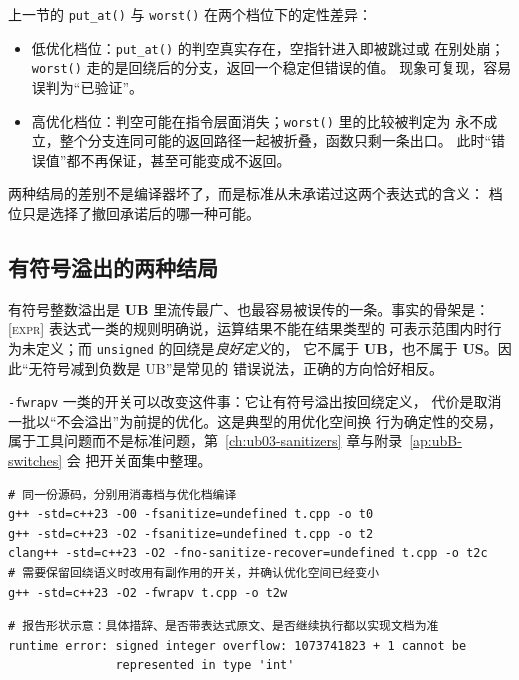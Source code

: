 \documentclass[12pt,a4paper,fontset=fandol]{ctexbook}
\newcommand{\Fn}[1]{\texttt{#1()}}
\newcommand{\Tp}[1]{\texttt{#1}}
\newcommand{\UB}{\textbf{\textsf{UB}}}
\newcommand{\USB}{\textbf{\textsf{US}}}
\newcommand{\Std}[1]{\textsc{[#1]}}
\newcommand{\Clause}[1]{\textsc{\small #1}}
\begin{document}
\begin{casebox}[title={同一份代码的两种命运：空指针与有符号溢出}]
上一节的 \Fn{put\_at} 与 \Fn{worst} 在两个档位下的定性差异：

\begin{itemize}
  \item 低优化档位：\Fn{put\_at} 的判空真实存在，空指针进入即被跳过或
        在别处崩；\Fn{worst} 走的是回绕后的分支，返回一个稳定但错误的值。
        现象可复现，容易误判为“已验证”。
  \item 高优化档位：判空可能在指令层面消失；\Fn{worst} 里的比较被判定为
        永不成立，整个分支连同可能的返回路径一起被折叠，函数只剩一条出口。
        此时“错误值”都不再保证，甚至可能变成不返回。
\end{itemize}

两种结局的差别不是编译器坏了，而是标准从未承诺过这两个表达式的含义：
档位只是选择了撤回承诺后的哪一种可能。
\end{casebox}

\subsection{有符号溢出的两种结局}\label{sec:ub01-overflow}

有符号整数溢出是 \UB{} 里流传最广、也最容易被误传的一条。事实的骨架是：
\Std{expr} \Clause{表达式}一类的规则明确说，运算结果不能在结果类型的
可表示范围内时行为未定义；而 \Tp{unsigned} 的回绕是\emph{良好定义}的，
它不属于 \UB{}，也不属于 \USB{}。因此“无符号减到负数是 UB”是常见的
错误说法，正确的方向恰好相反。

\Tp{-fwrapv} 一类的开关可以改变这件事：它让有符号溢出按回绕定义，
代价是取消一批以“不会溢出”为前提的优化。这是典型的用优化空间换
行为确定性的交易，属于工具问题而不是标准问题，第~\ref{ch:ub03-sanitizers} 章与附录~\ref{ap:ubB-switches} 会
把开关面集中整理。

\begin{lstlisting}[style=shellstyle, caption={命令行样例：在两个档位上观察同一份源码的诊断面}]
# 同一份源码，分别用消毒档与优化档编译
g++ -std=c++23 -O0 -fsanitize=undefined t.cpp -o t0
g++ -std=c++23 -O2 -fsanitize=undefined t.cpp -o t2
clang++ -std=c++23 -O2 -fno-sanitize-recover=undefined t.cpp -o t2c
# 需要保留回绕语义时改用有副作用的开关，并确认优化空间已经变小
g++ -std=c++23 -O2 -fwrapv t.cpp -o t2w
\end{lstlisting}

\begin{lstlisting}[style=outstyle, caption={工具输出样例：消毒器报告形状示意，非本仓库实测值}]
# 报告形状示意：具体措辞、是否带表达式原文、是否继续执行都以实现文档为准
runtime error: signed integer overflow: 1073741823 + 1 cannot be
               represented in type 'int'
\end{lstlisting}
\end{document}
